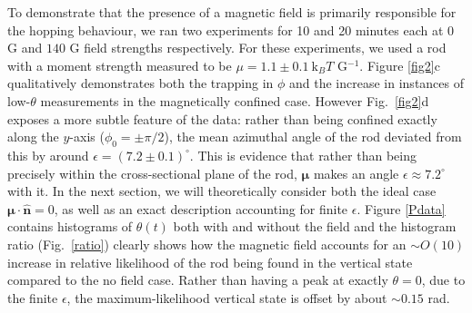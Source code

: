 \documentclass[aps,prl,reprint,twocolumn,superscriptaddress,showpacs]{revtex4-1}
\newcommand{\hvcrm}[1]{\mathbf{\hat{#1}}}
\newcommand{\vc}[1]{\boldsymbol{#1}}
\newcommand{\kk}{\mathrm{k}_B}
\begin{document}
To demonstrate that the presence of a magnetic field is primarily responsible for the hopping behaviour, we ran two experiments for 10 and 20 minutes each at $0$ G and $140$ G field strengths respectively. For these experiments, we used a rod with a moment strength measured to be $\mu = 1.1\pm0.1\ \kk T$ G$^{-1}$. Figure \ref{fig2}c qualitatively demonstrates both the trapping in $\phi$ and the increase in instances of low-$\theta$ measurements in the magnetically confined case. However Fig.\ \ref{fig2}d exposes a more subtle feature of the data: rather than being confined exactly along the $y$-axis ($\phi_0=\pm\pi/2$), the mean azimuthal angle of the rod deviated from this by around $\epsilon = (7.2\pm 0.1)^\circ$. This is evidence that rather than being precisely within the cross-sectional plane of the rod, $\vc{\mu}$ makes an angle $\epsilon\approx 7.2^\circ$ with it. In the next section, we will theoretically consider both the ideal case $\vc{\mu}\cdot\hvcrm{n}=0$, as well as an exact description accounting for finite $\epsilon$. Figure \ref{Pdata} contains histograms of $\theta(t)$ both with and without the field and the histogram ratio (Fig.\ \ref{ratio}) clearly shows how the magnetic field accounts for an $\sim O(10)$ increase in relative likelihood of the rod being found in the vertical state compared to the no field case. Rather than having a peak at exactly $\theta=0$, due to the finite $\epsilon$, the maximum-likelihood vertical state is offset by about $\sim 0.15$ rad. 

%
%
%
%
%
%
%
\end{document}
